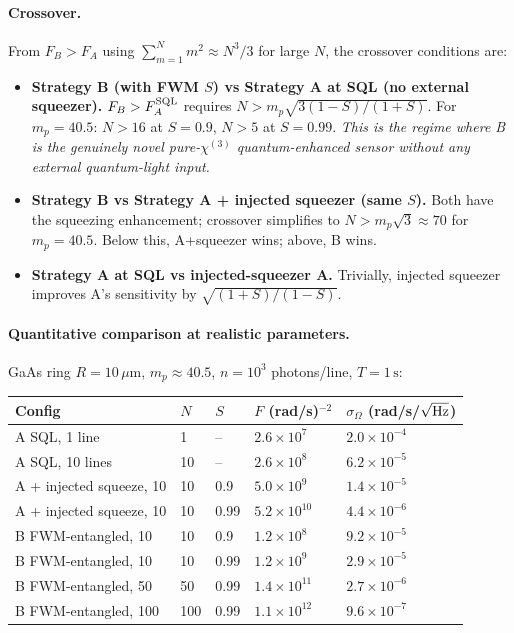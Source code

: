 \documentclass[11pt]{article}
\begin{document}
\paragraph{Crossover.}  From $F_B > F_A$ using $\sum_{m=1}^N m^2 \approx N^3/3$
for large $N$, the crossover conditions are:
\begin{itemize}\itemsep0em
\item \textbf{Strategy B (with FWM $S$) vs Strategy A at SQL
  (no external squeezer).}  $F_B > F_A^{\rm SQL}$ requires
  $N > m_p\sqrt{3(1-S)/(1+S)}$.  For $m_p=40.5$: $N>16$ at $S=0.9$,
  $N>5$ at $S=0.99$.  \emph{This is the regime where B is the
  genuinely novel pure-$\chi^{(3)}$ quantum-enhanced sensor without
  any external quantum-light input.}
\item \textbf{Strategy B vs Strategy A + injected squeezer (same $S$).}
  Both have the squeezing enhancement; crossover simplifies to
  $N > m_p\sqrt{3}\approx 70$ for $m_p=40.5$.  Below this, A+squeezer
  wins; above, B wins.
\item \textbf{Strategy A at SQL vs injected-squeezer A.} Trivially,
  injected squeezer improves A's sensitivity by $\sqrt{(1+S)/(1-S)}$.
\end{itemize}

\paragraph{Quantitative comparison at realistic parameters.}
GaAs ring $R=10\,\mu\mathrm{m}$, $m_p\approx 40.5$, $n=10^3$ photons/line,
$T=1\,\mathrm{s}$:
\begin{center}\small
\begin{tabular}{lllll}
\toprule
Config & $N$ & $S$ & $F$ (rad/s)$^{-2}$ & $\sigma_\Omega$ (rad/s/$\sqrt{\rm Hz}$) \\
\midrule
A SQL, 1 line            & 1   & --   & $2.6\times 10^7$  & $2.0\times 10^{-4}$ \\
A SQL, 10 lines          & 10  & --   & $2.6\times 10^8$  & $6.2\times 10^{-5}$ \\
A + injected squeeze, 10 & 10  & 0.9  & $5.0\times 10^9$  & $1.4\times 10^{-5}$ \\
A + injected squeeze, 10 & 10  & 0.99 & $5.2\times 10^{10}$ & $4.4\times 10^{-6}$ \\
B FWM-entangled, 10      & 10  & 0.9  & $1.2\times 10^{8}$ & $9.2\times 10^{-5}$ \\
B FWM-entangled, 10      & 10  & 0.99 & $1.2\times 10^{9}$  & $2.9\times 10^{-5}$ \\
B FWM-entangled, 50      & 50  & 0.99 & $1.4\times 10^{11}$ & $2.7\times 10^{-6}$ \\
B FWM-entangled, 100     & 100 & 0.99 & $1.1\times 10^{12}$ & $9.6\times 10^{-7}$ \\
\bottomrule
\end{tabular}
\end{center}
\end{document}
